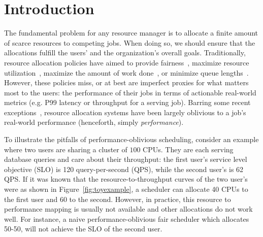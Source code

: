 
\section{Introduction}
\label{sec:intro}




The fundamental problem for any resource manager is to allocate a finite amount of
scarce resources to competing jobs.
When doing so, we should ensure that the allocations fulfill the users' and the
organization's overall goals.
% 
Traditionally, resource allocation policies have aimed to
provide fairness~\citep{ghodsi2011dominant,demers1989analysis},
maximize resource utilization~\citep{xiao2018gandiva},
maximize the amount of work done~\citep{ghodsi2011dominant},
or
minimize queue lengths~\citep{racksched,sparrow}.
% 
However,
these policies miss, or at best are imperfect proxies for what matters most to the users:
the performance of their jobs in terms of actionable real-world metrics
(e.g. P99 latency or throughput for a serving job).
Barring some recent exceptions~\citep{delimitrou2014quasar,chen2019parties,zhang2021sinan,jockey},
resource allocation systems have been largely oblivious to a job's real-world performance
(henceforth, simply \emph{performance}). 


\insertResUtilIllus

To illustrate the pitfalls of performance-oblivious scheduling,
consider an example where two users are sharing a cluster of $100$ CPUs.
They are each serving database queries and care about their throughput:
the first user's service level objective (SLO) is 120 query-per-second (QPS),
while the second user's is 62 QPS.
If it was known that the resource-to-throughput curves of the two user's were as shown
in Figure~\ref{fig:toyexample},
a scheduler can allocate 40 CPUs to the first user and 60 to the second.
However, in practice, this resource to performance mapping is usually not available and other allocations do not work well.
For instance, a naive performance-oblivious fair scheduler which allocates 50-50, will not achieve the SLO of the second user.

